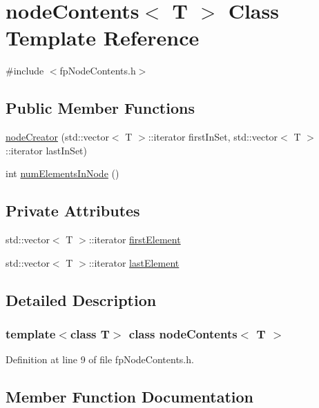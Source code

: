 \hypertarget{classnodeContents}{}\section{node\+Contents$<$ T $>$ Class Template Reference}
\label{classnodeContents}


{\ttfamily \#include $<$fp\+Node\+Contents.\+h$>$}

\subsection*{Public Member Functions}
\begin{DoxyCompactItemize}
\item 
\hyperlink{classnodeContents_ac480b2186fc39c2258a696d906d89aea}{node\+Creator} (std\+::vector$<$ T $>$\+::iterator first\+In\+Set, std\+::vector$<$ T $>$\+::iterator last\+In\+Set)
\item 
int \hyperlink{classnodeContents_a161b1ff6370efdb429ef3e5afe7623c2}{num\+Elements\+In\+Node} ()
\end{DoxyCompactItemize}
\subsection*{Private Attributes}
\begin{DoxyCompactItemize}
\item 
std\+::vector$<$ T $>$\+::iterator \hyperlink{classnodeContents_ae9259755596d9e4542ad73605112569f}{first\+Element}
\item 
std\+::vector$<$ T $>$\+::iterator \hyperlink{classnodeContents_addfed5d7004d0d126856cd5907e11ff3}{last\+Element}
\end{DoxyCompactItemize}


\subsection{Detailed Description}
\subsubsection*{template$<$class T$>$\newline
class node\+Contents$<$ T $>$}



Definition at line 9 of file fp\+Node\+Contents.\+h.



\subsection{Member Function Documentation}
\mbox{\label{classnodeContents_ac480b2186fc39c2258a696d906d89aea}} 
